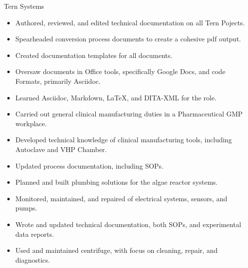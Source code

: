\documentclass[11pt,oneside,a4paper,titlepage]{article}
\begin{document}
{\begin{minipage}{11.3cm}
        {Tern Systems}
        {\begin{itemize} \scriptsize
            \item Authored, reviewed, and edited technical documentation on all Tern Pojects.
            \item Spearheaded conversion process documents to create a cohesive pdf output.
            \item Created documentation templates for all documents.
            \item Oversaw documents in Office tools, specifically Google Docs, and code Formats, primarily Asciidoc.
            \item Learned Asciidoc, Markdown, LaTeX, and DITA-XML for the role. 
        \end{itemize}}  
        
        \vspace*{0.12cm}
            
        {\begin{itemize} \scriptsize
            \item Carried out general clinical manufacturing duties in a Pharmaceutical GMP workplace. 
            \item Developed technical knowledge of clinical manufacturing tools, including Autoclave and VHP Chamber. \item Updated process documentation, including SOPs.
        \end{itemize}}
        
        \vspace*{0.12cm}
        
        {\begin{itemize} \scriptsize
            \item Planned and built plumbing solutions for the algae reactor systems. 
            \item Monitored, maintained, and repaired of electrical systems, sensors, and pumps. 
            \item Wrote and updated technical documentation, both SOPs, and experimental data reports.
            \item Used and maintained centrifuge, with focus on  cleaning, repair, and diagnostics.
        \end{itemize}}
    \end{minipage}} %
\end{document}

